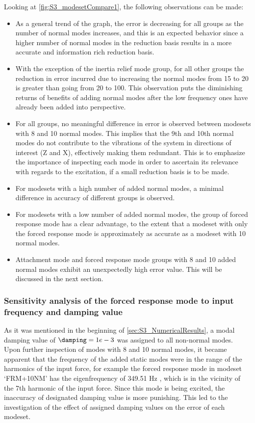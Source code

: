 Looking at \cref{fig:S3_modesetCompare1}, the following observations can be made:
\begin{itemize}
    \item As a general trend of the graph, the error is decreasing for all groups as the number of normal modes increases, and this is an expected behavior since a higher number of normal modes in the reduction basis results in a more accurate and information rich reduction basis.
    \item With the exception of the inertia relief mode group, for all other groups the reduction in error incurred due to increasing the normal modes from 15 to 20 is greater than going from 20 to 100. This observation puts the diminishing returns of benefits of adding normal modes after the low frequency ones have already been added into perspective.
    \item For all groups, no meaningful difference in error is observed between modesets with 8 and 10 normal modes. This implies that the 9th and 10th normal modes do not contribute to the vibrations of the system in directions of interest (Z and X), effectively making them redundant. This is to emphasize the importance of inspecting each mode in order to ascertain its relevance with regards to the excitation, if a small reduction basis is to be made.
    \item For modesets with a high number of added normal modes, a minimal difference in accuracy of different groups is observed.
    \item For modesets with a low number of added normal modes, the group of forced response mode has a clear advantage, to the extent that a modeset with only the forced response mode is approximately as accurate as a modeset with 10 normal modes.
    \item Attachment mode and forced response mode groups with 8 and 10 added normal modes exhibit an unexpectedly high error value. This will be discussed in the next section.
\end{itemize}


\subsubsection{Sensitivity analysis of the forced response mode to input frequency and damping value}


As it was mentioned in the beginning of \cref{sec:S3_NumericalResults}, a modal damping value of \(\damping = 1e-3\) was assigned to all non-normal modes. Upon further inspection of modes with 8 and 10 normal modes, it became apparent that the frequency of the added static modes were in the range of the harmonics of the input force, for example the forced response mode in modeset ‘FRM+10NM’ has the eigenfrequency of 349.51 Hz , which is in the vicinity of the 7th harmonic of the input force. Since this mode is being excited, the inaccuracy of designated damping value is more punishing. This led to the investigation of the effect of assigned damping values on the error of each modeset.

